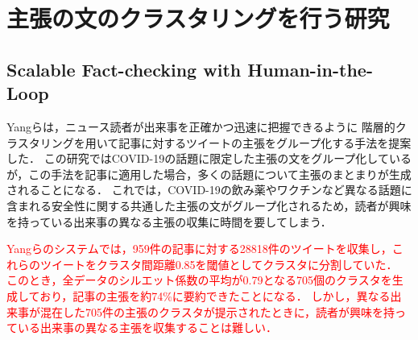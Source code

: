 \documentclass[12pt,a4j]{jreport}
\begin{document}




\section{主張の文のクラスタリングを行う研究}

\subsection{Scalable Fact-checking with Human-in-the-Loop}
\label{subsection_scalable_fact_checking}

Yangらは，ニュース読者が出来事を正確かつ迅速に把握できるように
階層的クラスタリングを用いて記事に対するツイートの主張をグループ化する手法を提案した\cite{yang_scalable_2021}．
この研究ではCOVID-19の話題に限定した主張の文をグループ化しているが，この手法を記事に適用した場合，多くの話題について主張のまとまりが生成されることになる．
これでは，COVID-19の飲み薬やワクチンなど異なる話題に含まれる安全性に関する共通した主張の文がグループ化されるため，読者が興味を持っている出来事の異なる主張の収集に時間を要してしまう．

\textcolor{red}{
Yangらのシステムでは，959件の記事に対する28818件のツイートを収集し，これらのツイートをクラスタ間距離0.85を閾値としてクラスタに分割していた．
このとき，全データのシルエット係数の平均が0.79となる705個のクラスタを生成しており，記事の主張を約74\%に要約できたことになる．
しかし，異なる出来事が混在した705件の主張のクラスタが提示されたときに，読者が興味を持っている出来事の異なる主張を収集することは難しい．
}
\end{document}
